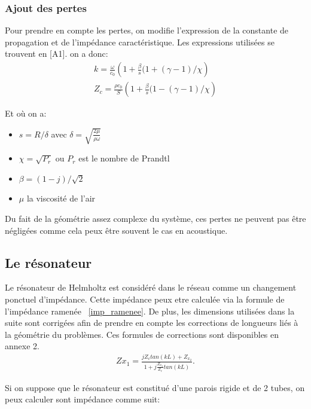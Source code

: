 \subsubsection{Ajout des pertes}

Pour prendre en compte les pertes, on modifie l'expression de la constante de propagation et de l'impédance caractéristique. Les expressions utilisées se trouvent en [A1]. on a donc:
\begin{eqnarray*}
 k =  \frac{\omega}{c_0} \left( 1 + \frac{\beta}{s}(1+(\gamma-1)/ \chi \right) \\
 Z_c =  \frac{\rho c_0}{S} \left( 1 + \frac{\beta}{s}(1-(\gamma-1)/ \chi \right) 
\end{eqnarray*}

Et où on a:
\begin{itemize}
 \item  $s=R/ \delta$ avec $\delta = \sqrt{\frac{2 \mu}{\rho \omega}}$
 \item  $\chi = \sqrt{P_r}$ ou $P_r$ est le nombre de Prandtl
 \item $\beta = (1-j)/\sqrt{2}$ 
 \item $\mu$ la viscosité de l'air
\end{itemize}

Du fait de la géométrie assez complexe du système, ces pertes ne peuvent pas être négligées comme cela peux être souvent le cas en acoustique.

\subsection{Le résonateur}
Le résonateur de Helmholtz est considéré dans le réseau comme un changement ponctuel d'impédance. Cette impédance peux etre calculée via la formule de l'impédance ramenée ~\ref{imp_ramenee}. De plus, les dimensions utilisées dans la suite sont corrigées afin de prendre en compte les corrections de longueurs liés à la géométrie du problèmes. Ces formules de corrections sont disponibles en annexe 2.
\begin{eqnarray}
Z{x_1}=\frac{jZ_c tan(kL)+Z_{x_2}}{1+j\frac{Z_{x_2}}{Z_c}tan(kL)}.
\end{eqnarray}

Si on suppose que le résonateur est constitué d'une parois rigide et de 2 tubes, on peux calculer sont impédance comme suit:

